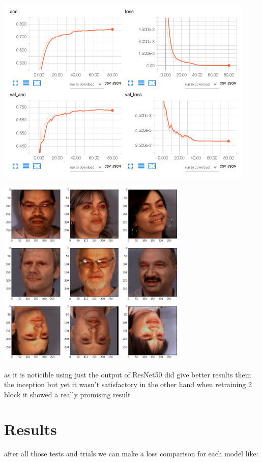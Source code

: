 \documentclass[11pt]{article}
\begin{document}
\begin{enumerate}
\centerline{\includegraphics[height=9cm]{./images/resnet2loss.png}}
\centerline{\includegraphics[height=9cm]{./images/resnet2res.png}}

\pagebreak
as it is noticible using just the output of ResNet50 did give better results
them the inception but yet it wasn't satisfactory in the other hand when
retraining 2 block it showed a really promising result
\end{enumerate}

\section{Results}
\label{sec:org13cda33}

after all those tests and trials we can make a loss comparison for each model
like:
\end{document}

